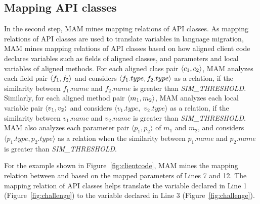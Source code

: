 \subsection{Mapping API classes}
\label{sec:approach:mappingtypes}

In the second step, MAM mines mapping relations of
API classes. As mapping relations of API classes are used
to translate variables in language migration, MAM mines mapping
relations of API classes based on how aligned client code declares
variables such as fields of aligned classes, and parameters and local variables of aligned methods. For each aligned class pair $\langle c_1, c_2 \rangle$, MAM analyzes each field pair $\langle f_1, f_2 \rangle$ and considers
$\langle f_1.type, f_2.type \rangle$ as a relation, if the similarity between $f_1.name$ and $f_2.name$ is
greater than \emph{SIM\_THRESHOLD}. Similarly, for each aligned method pair
$\langle m_1, m_2 \rangle$, MAM analyzes each local variable pair
$\langle v_1, v_2 \rangle$ and considers $\langle v_1.type,$ $
v_2.type\rangle$ as a relation, if the similarity between
$v_1.name$ and $v_2.name$ is greater than
\emph{SIM\_THRESHOLD}. MAM also analyzes each parameter pair
$\langle p_1, p_2\rangle$ of $m_1$ and $m_2$, and considers $\langle p_1.type, p_2.type\rangle$ as
a relation when the similarity between $p_1.name$ and $p_2.name$ is greater than \emph{SIM\_THRESHOLD}.

For the example shown in Figure~\ref{fig:clientcode}, MAM
mines the mapping relation between  and
 based on the mapped parameters of Lines 7
and 12. The mapping relation of API
classes helps translate the variable declared in Line 1
(Figure~\ref{fig:challenge}) to the variable declared in Line 3
(Figure~\ref{fig:challenge}).



